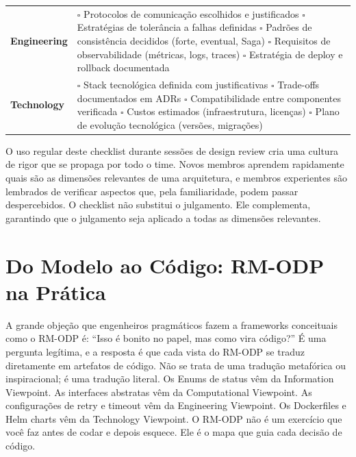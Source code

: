\begin{table}[htbp]
\begin{tabular}{@{}lp{10cm}@{}}
\addlinespace
\textbf{Engineering} &
$\square$ Protocolos de comunicação escolhidos e justificados \newline
$\square$ Estratégias de tolerância a falhas definidas \newline
$\square$ Padrões de consistência decididos (forte, eventual, Saga) \newline
$\square$ Requisitos de observabilidade (métricas, logs, traces) \newline
$\square$ Estratégia de deploy e rollback documentada \\
\addlinespace
\textbf{Technology} &
$\square$ Stack tecnológica definida com justificativas \newline
$\square$ Trade-offs documentados em ADRs \newline
$\square$ Compatibilidade entre componentes verificada \newline
$\square$ Custos estimados (infraestrutura, licenças) \newline
$\square$ Plano de evolução tecnológica (versões, migrações) \\
\bottomrule
\end{tabular}
\end{table}

O uso regular deste checklist durante sessões de design review cria uma cultura
de rigor que se propaga por todo o time. Novos membros aprendem rapidamente quais
são as dimensões relevantes de uma arquitetura, e membros experientes são lembrados
de verificar aspectos que, pela familiaridade, podem passar despercebidos. O
checklist não substitui o julgamento. Ele complementa, garantindo que o
julgamento seja aplicado a todas as dimensões relevantes.


\section{Do Modelo ao Código: RM-ODP na Prática}

A grande objeção que engenheiros pragmáticos fazem a frameworks conceituais como
o RM-ODP é: ``Isso é bonito no papel, mas como vira código?'' É uma pergunta
legítima, e a resposta é que cada vista do RM-ODP se traduz diretamente em
artefatos de código. Não se trata de uma tradução metafórica ou inspiracional;
é uma tradução literal. Os Enums de status vêm da Information Viewpoint. As
interfaces abstratas vêm da Computational Viewpoint. As configurações de retry e
timeout vêm da Engineering Viewpoint. Os Dockerfiles e Helm charts vêm da
Technology Viewpoint. O RM-ODP não é um exercício que você faz antes de codar e
depois esquece. Ele é o mapa que guia cada decisão de código.

